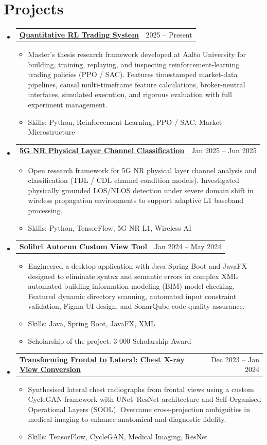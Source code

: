 \documentclass[a4paper,11pt]{article}
\makeatletter
\newcommand{\resumeItem}[1]{
  \item\small{#1}
}
\newcommand{\resumeItemListStart}{\begin{itemize}[rightmargin=0.11in]}
\newcommand{\resumeItemListEnd}{\end{itemize}}
\newcommand{\resumeTrioHeading}[3]{
  \item\small{
    \begin{tabular*}{0.96\textwidth}[t]{
      l@{\extracolsep{\fill}}r
    }
      \textbf{#1} & #3
    \end{tabular*}
  }
}
\newcommand{\resumeHeadingListStart}{
  \begin{itemize}[leftmargin=0.15in, label={}]
}
\newcommand{\resumeHeadingListEnd}{\end{itemize}}
\makeatother
\begin{document}
\section{Projects}
  \resumeHeadingListStart{}
    \resumeTrioHeading{\href{https://github.com/nntk072/Quantitative-RL-Trading-System}{\uline{Quantitative RL Trading System}}}{}{2025 -- Present}
      \resumeItemListStart{}
        \resumeItem{Master's thesis research framework developed at Aalto University for building, training, replaying, and inspecting reinforcement-learning trading policies (PPO / SAC). Features timestamped market-data pipelines, causal multi-timeframe feature calculations, broker-neutral interfaces, simulated execution, and rigorous evaluation with full experiment management.}
        \resumeItem{Skills: Python, Reinforcement Learning, PPO / SAC, Market Microstructure}
      \resumeItemListEnd{}
    \resumeTrioHeading{\href{https://github.com/nntk072/5g-nr-channel-condition}{\uline{5G NR Physical Layer Channel Classification}}}{}{Jan 2025 -- Jun 2025}
      \resumeItemListStart{}
        \resumeItem{Open research framework for 5G NR physical layer channel analysis and classification (TDL / CDL channel condition models). Investigated physically grounded LOS/NLOS detection under severe domain shift in wireless propagation environments to support adaptive L1 baseband processing.}
        \resumeItem{Skills: Python, TensorFlow, 5G NR L1, Wireless AI}
      \resumeItemListEnd{}
    \resumeTrioHeading{Solibri Autorun Custom View Tool}{}{Jan 2024 -- May 2024}
      \resumeItemListStart{}
        \resumeItem{Engineered a desktop application with Java Spring Boot and JavaFX designed to eliminate syntax and semantic errors in complex XML automated building information modeling (BIM) model checking. Featured dynamic directory scanning, automated input constraint validation, Figma UI design, and SonarQube code quality assurance.}
        \resumeItem{Skills: Java, Spring Boot, JavaFX, XML}
        \resumeItem{Scholarship of the project: \texteuro{}3 000 Scholarship Award}
      \resumeItemListEnd{}
    \resumeTrioHeading{\href{https://trepo.tuni.fi/handle/10024/157272}{\uline{Transforming Frontal to Lateral: Chest X-ray View Conversion}}}{}{Dec 2023 -- Jan 2024}
      \resumeItemListStart{}
        \resumeItem{Synthesised lateral chest radiographs from frontal views using a custom CycleGAN framework with UNet--ResNet architecture and Self-Organised Operational Layers (SOOL). Overcame cross-projection ambiguities in medical imaging to enhance anatomical and diagnostic fidelity.}
        \resumeItem{Skills: TensorFlow, CycleGAN, Medical Imaging, ResNet}
      \resumeItemListEnd{}
  \resumeHeadingListEnd{}
\end{document}
